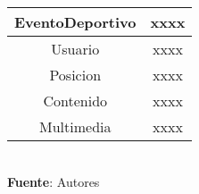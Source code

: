\begin{table}[!htb]
\begin{center}
{\begin{tabular}{|p{4cm}|p{4cm}|p{4cm}|p{4cm}|}
			\hline
			\multicolumn{2}{|c|}{EventoDeportivo} & 
			\multicolumn{2}{c|}{xxxx} \\
			\hline
			\multicolumn{2}{|c|}{Usuario} & 
			\multicolumn{2}{c|}{xxxx} \\
			\hline
			\multicolumn{2}{|c|}{Posicion} & 
			\multicolumn{2}{c|}{xxxx} \\
			\hline
			\multicolumn{2}{|c|}{Contenido} & 
			\multicolumn{2}{c|}{xxxx} \\
			\hline
			\multicolumn{2}{|c|}{Multimedia} & 
			\multicolumn{2}{c|}{xxxx} \\
			\hline
		\end{tabular}
		} \\
		\textbf{Fuente}: Autores
	\end{center}
\end{table}